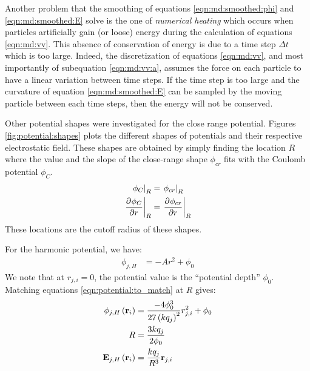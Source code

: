 Another problem that the smoothing of equations \eqref{eqn:md:smoothed:phi} and
\eqref{eqn:md:smoothed:E} solve is the one of \textit{numerical heating} which
occurs when particles artificially gain (or loose) energy during the
calculation of equations \eqref{eqn:md:vv}. This absence of conservation of
energy is due to a time step $\Delta t$ which is too large. Indeed, the
discretization of equations \eqref{eqn:md:vv}, and most importantly of
subequation \eqref{eqn:md:vv:a}, assumes the force on each particle to have a
linear variation between time steps. If the time step is too large and the
curvature of equation \eqref{eqn:md:smoothed:E} can be sampled by the moving
particle between each time steps, then the energy will not be conserved.

Other potential shapes were investigated for the close range potential. Figures
\ref{fig:potential:shapes} plots the different shapes of potentials and their
respective electrostatic field. These shapes are obtained by simply finding the
location $R$ where the value and the slope of the close-range shape
$\phi_{cr}$ fits with the Coulomb potential $\phi_C$.
\begin{subequations}
\begin{align}
\left. \phi_C        \right|_{R} & = \left. \phi_{cr} \right|_{R} \\
\left. \frac{\partial^{{}} \phi_C}{\partial r^{{}}} \right|_{R} & = \left. \frac{\partial^{{}} \phi_{cr}}{\partial r^{{}}} \right|_{R}
\end{align}
\label{eqn:potential:to_match}
\end{subequations}
These locations are the cutoff radius of these shapes.

For the harmonic potential, we have:
\begin{align}
\phi_{j,H} & = -A r^2 + \phi_0
\end{align}
We note that at $r_{j,i} = 0$, the potential value is the ``potential depth''
$\phi_0$.
Matching equations \eqref{eqn:potential:to_match} at $R$ gives:
\begin{subequations}
\begin{align}
\phi_{j,H}\left( \textbf{r}_i \right) & = \frac{-4 \phi_0^3}{27 \left( k q_j \right)^2} r_{j,i}^2 + \phi_0
\\
R & = \frac{3 k q_j}{2 \phi_0} \\
\textbf{E}_{j,H}\left( \textbf{r}_i \right) & = \frac{k q_j}{R^3} \textbf{r}_{j,i}
\end{align}
\end{subequations}


